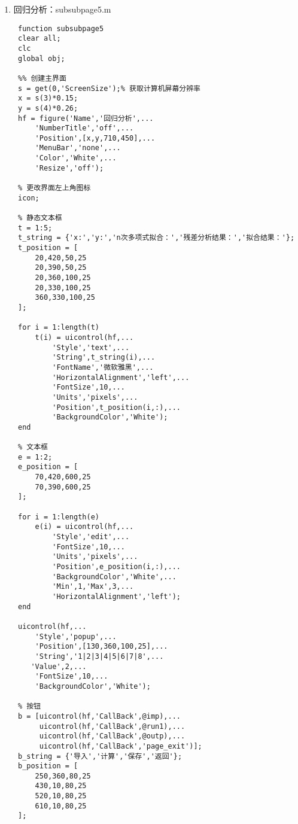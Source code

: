 \begin{enumerate}
\begin{lstlisting}
 obj = findobj(gcf);
 
 function run1(a,b)
 global obj;
 A = str2num(get(obj(9),'String'));
 L = str2num(get(obj(8),'String'));
 P = str2num(get(obj(7),'String'));
 if isempty(A)||isempty(L)||isempty(P)
 	warndlg('缺少输入参数！');
 	return;
 end
 [C,D,EX] = data_process4(A,L,P);
 set(obj(7),'String',num2str(C));
 set(obj(6),'String',num2str(D));
 set(obj(5),'String',num2str(EX));\end{lstlisting}
	\item 回归分析：subsubpage5.m
	\begin{lstlisting}
 function subsubpage5
 clear all;
 clc
 global obj;
 
 %% 创建主界面
 s = get(0,'ScreenSize');% 获取计算机屏幕分辨率
 x = s(3)*0.15;
 y = s(4)*0.26;
 hf = figure('Name','回归分析',...
     'NumberTitle','off',...
     'Position',[x,y,710,450],...
     'MenuBar','none',...
     'Color','White',...
     'Resize','off');
 
 % 更改界面左上角图标
 icon;
 
 % 静态文本框
 t = 1:5;
 t_string = {'x:','y:','n次多项式拟合：','残差分析结果：','拟合结果：'};
 t_position = [
     20,420,50,25
     20,390,50,25
     20,360,100,25
     20,330,100,25
     360,330,100,25
 ];
 
 for i = 1:length(t)
     t(i) = uicontrol(hf,...
         'Style','text',...
         'String',t_string(i),...
         'FontName','微软雅黑',...
         'HorizontalAlignment','left',...
         'FontSize',10,...
         'Units','pixels',...
         'Position',t_position(i,:),...
         'BackgroundColor','White');
 end
 
 % 文本框
 e = 1:2;
 e_position = [
     70,420,600,25
     70,390,600,25
 ];
 
 for i = 1:length(e)
     e(i) = uicontrol(hf,...
         'Style','edit',...
         'FontSize',10,...
         'Units','pixels',...
         'Position',e_position(i,:),...
         'BackgroundColor','White',...
         'Min',1,'Max',3,...
         'HorizontalAlignment','left');
 end
 
 uicontrol(hf,...
     'Style','popup',...
     'Position',[130,360,100,25],...
     'String','1|2|3|4|5|6|7|8',...
 	'Value',2,...
     'FontSize',10,...
     'BackgroundColor','White');
 
 % 按钮
 b = [uicontrol(hf,'CallBack',@imp),...
      uicontrol(hf,'CallBack',@run1),...
      uicontrol(hf,'CallBack',@outp),...
      uicontrol(hf,'CallBack','page_exit')];
 b_string = {'导入','计算','保存','返回'};
 b_position = [
     250,360,80,25
     430,10,80,25
     520,10,80,25
     610,10,80,25
 ];
 

\end{lstlisting}
\end{enumerate}
